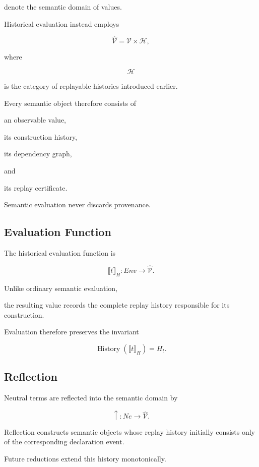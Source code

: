 \documentclass[12pt,oneside]{article}
\theoremstyle{definition}
\theoremstyle{remark}
\DeclareMathOperator{\History}{History}
\begin{document}
denote the semantic domain of values.

Historical evaluation instead employs

\[
\widehat{\mathcal V}
=
\mathcal V
\times
\mathcal H,
\]

where

\[
\mathcal H
\]

is the category of replayable histories introduced earlier.

Every semantic object therefore consists of

an observable value,

its construction history,

its dependency graph,

and

its replay certificate.

Semantic evaluation never discards provenance.


\subsection{Evaluation Function}

The historical evaluation function is

\[
\llbracket
t
\rrbracket
_H
:
Env
\rightarrow
\widehat{\mathcal V}.
\]

Unlike ordinary semantic evaluation,

the resulting value records the complete replay history responsible for its
construction.

Evaluation therefore preserves the invariant

\[
\History(
\llbracket
t
\rrbracket_H
)
=
H_t.
\]


\subsection{Reflection}

Neutral terms are reflected into the semantic domain by

\[
\uparrow
:
Ne
\rightarrow
\widehat{\mathcal V}.
\]

Reflection constructs semantic objects whose replay history initially consists
only of the corresponding declaration event.

Future reductions extend this history monotonically.
\end{document}
